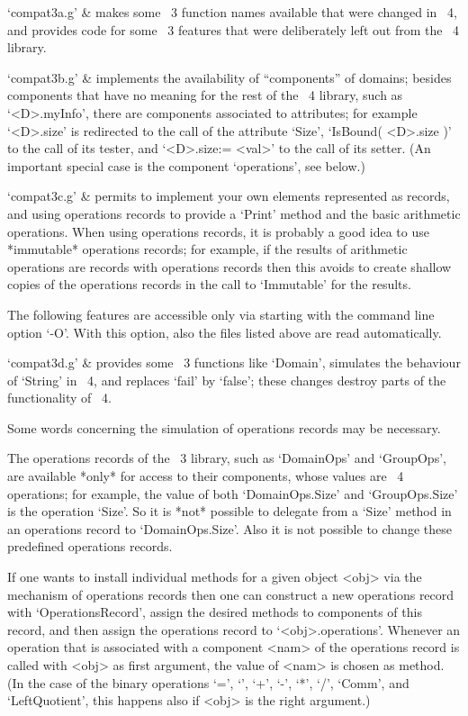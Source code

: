 \beginitems
`compat3a.g' &
    makes some {\GAP}~3 function names available that were changed
    in {\GAP}~4,
    and provides code for some {\GAP}~3 features that were
    deliberately left out from the {\GAP}~4 library.

`compat3b.g' &
    implements the availability of ``components'' of domains;
    besides components that have no meaning for the rest of the {\GAP}~4
    library, such as `<D>.myInfo', there are components associated to
    attributes; for example `<D>.size' is redirected to the call of the
    attribute `Size', `IsBound( <D>.size )' to the call of its tester,
    and `<D>.size:= <val>' to the call of its setter.
    (An important special case is the component `operations', see below.)

`compat3c.g' &
    permits to implement your own elements represented as records,
    and using operations records to provide a `Print' method and
    the basic arithmetic operations.
    When using operations records, it is probably a good idea to
    use *immutable* operations records; for example, if the results
    of arithmetic operations are records with operations records then
    this avoids to create shallow copies of the operations records 
    in the call to `Immutable' for the results.
\enditems

The following features are accessible only via starting {\GAP} with
the command line option `-O'.
With this option, also the files listed above are read automatically.

\beginitems
`compat3d.g' &
    provides some {\GAP}~3 functions like `Domain', simulates the
    behaviour of `String' in {\GAP}~4, and replaces `fail' by `false';
    these changes destroy parts of the functionality of {\GAP}~4.
\enditems

Some words concerning the simulation of operations records may be
necessary.

The operations records of the {\GAP}~3 library, such as `DomainOps'
and `GroupOps', are available *only* for access to their components,
whose values are {\GAP}~4 operations; for example, the value of both
`DomainOps.Size' and `GroupOps.Size' is the operation `Size'.
So it is *not* possible to delegate from a `Size' method in an
operations record to `DomainOps.Size'.
Also it is not possible to change these predefined operations records.

If one wants to install individual methods for a given object <obj>
via the mechanism of operations records then one can construct a new
operations record with `OperationsRecord', assign the desired methods
to components of this record, and then assign the operations record
to `<obj>.operations'.
Whenever an operation that is associated with a component <nam> of the
operations record is called with <obj> as first argument,
the value of <nam> is chosen as method.
(In the case of the binary operations `=', `\<', `+', `-', `*', `/',
`Comm', and `LeftQuotient', this happens also if <obj> is the
right argument.)

